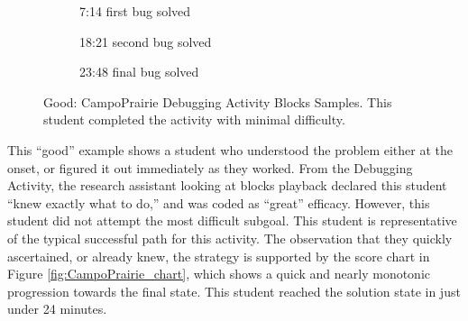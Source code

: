 \begin{figure}
\begin{subfigure}{.45\textwidth}
		\caption{7:14 first bug solved} 
	\end{subfigure}\hfill
	\begin{subfigure}{.45\textwidth}
		\caption{18:21 second bug solved} 
	\end{subfigure}\hfill
	\begin{subfigure}{.45\textwidth}
		\caption{23:48 final bug solved} 
	\end{subfigure}

	\caption[Good: CampoPrairie Debugging Activity Blocks Samples]{Good: CampoPrairie Debugging Activity Blocks Samples. This student completed the activity with minimal difficulty.}
	\label{fig:CampoPrairie_blocks}
\end{figure}

This ``good'' example shows a student who understood the problem either at the onset, or figured it out immediately as they worked. From the Debugging Activity, the research assistant looking at blocks playback declared this student ``knew exactly what to do,'' and was coded as ``great'' efficacy. However, this student did not attempt the most difficult subgoal. This student is representative of the typical successful path for this activity. The observation that they quickly ascertained, or already knew, the strategy is supported by the score chart in Figure \ref{fig:CampoPrairie_chart}, which shows a quick and nearly monotonic progression towards the final state. This student reached the solution state in just under 24 minutes.

